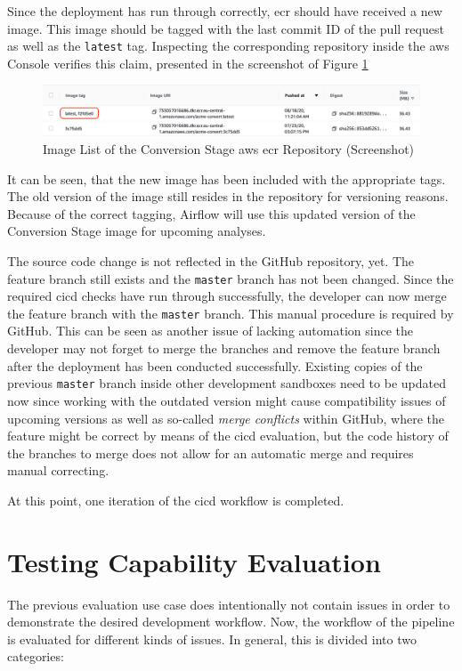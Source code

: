 Since the deployment has run through correctly, \ac{ecr} should have received a new image. This image should be tagged with the last commit ID of the pull request as well as the \texttt{latest} tag. Inspecting the corresponding repository inside the \ac{aws} Console verifies this claim, presented in the screenshot of Figure \ref{fig:6-ecr}

\begin{figure}[h!]
	\centering
	\includegraphics[width=\linewidth]{main-matter/img/6-ecr}
	\caption{Image List of the Conversion Stage \acs{aws} \acs{ecr} Repository (Screenshot)}
	\label{fig:6-ecr}
\end{figure}

It can be seen, that the new image has been included with the appropriate tags. The old version of the image still resides in the repository for versioning reasons. Because of the correct tagging, Airflow will use this updated version of the Conversion Stage image for upcoming analyses. 

The source code change is not reflected in the GitHub repository, yet. The feature branch still exists and the \texttt{master} branch has not been changed. Since the required \ac{cicd} checks have run through successfully, the developer can now merge the feature branch with the \texttt{master} branch. This manual procedure is required by GitHub. This can be seen as another issue of lacking automation since the developer may not forget to merge the branches and remove the feature branch after the deployment has been conducted successfully. Existing copies of the previous \texttt{master} branch inside other development sandboxes need to be updated now since working with the outdated version might cause compatibility issues of upcoming versions as well as so-called \textit{merge conflicts} within GitHub, where the feature might be correct by means of the \ac{cicd} evaluation, but the code history of the branches to merge does not allow for an automatic merge and requires manual correcting.

At this point, one iteration of the \ac{cicd} workflow is completed.

\section{Testing Capability Evaluation}
The previous evaluation use case does intentionally not contain issues in order to demonstrate the desired development workflow. Now, the workflow of the pipeline is evaluated for different kinds of issues. In general, this is divided into two categories:

